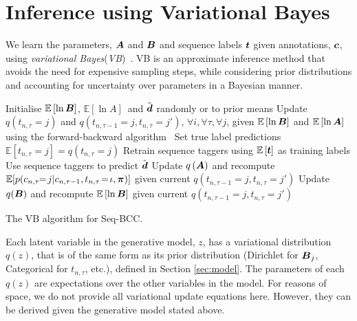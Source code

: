 
\section{Inference using Variational Bayes} \label{sec:vb}
 
We learn the parameters, $\boldsymbol A$ and $\boldsymbol B$ and sequence labels $\boldsymbol t$
given annotations, $\boldsymbol c$, using \emph{variational Bayes}(\emph{VB})~\cite{attias_advances_2000}.
VB is an approximate inference method that avoids the need for expensive sampling steps,
while considering prior distributions and accounting for uncertainty over parameters in a Bayesian manner.
\begin{algorithm}
 \nl Initialise $\mathbb{E}\left[\ln \boldsymbol B \right]$,
 $\mathbb{E}\left[\ln A \right]$\, and 
 $\hat{\boldsymbol d}$ randomly or to prior means\;
 {
 \nl Update $q(t_{n,\tau}=j)$ and $q(t_{n,\tau-1}=j, t_{n,\tau}=j')$, $\forall i,\forall \tau,\forall j$,
 given $\mathbb{E}\left[\ln \boldsymbol B \right]$ and 
 $\mathbb{E}\left[\ln\boldsymbol A \right]$
 using the forward-backward algorithm~\cite{ghahramani2001introduction}\;
 \nl Set true label predictions $\mathbb{E}\left[t_{n,\tau}=j\right] = q(t_{n,\tau}=j)$ \;
 \nl Retrain sequence taggers using $\mathbb{E}\left[\boldsymbol t\right]$ as training labels\;
 \nl Use sequence taggers to predict $\hat{\boldsymbol d}$\;
 \nl Update $q\left(\boldsymbol A\right)$ and recompute $\mathbb{E}[p( c_{n,\tau} \!\!=\! j | c_{n,\tau-1}, t_{n,\tau} \!=\! \iota, \boldsymbol\pi )]$ given current $q(t_{n,\tau-1}=j, t_{n,\tau}=j')$\;
 \nl Update $q(\boldsymbol B)$ and recompute $\mathbb{E}\left[\ln\boldsymbol B \right]$ given current $q(t_{n,\tau-1}=j, t_{n,\tau}=j')$\;
 }
\caption{The VB algorithm for Seq-BCC.}
\label{al:vb_bac}
\end{algorithm}
Each latent variable in the generative model, $z$, has a variational distribution $q(z)$,
that is of the same form as its prior distribution (Dirichlet for $\boldsymbol B_j$, Categorical for $t_{n,\tau}$, etc.),
defined in Section \ref{sec:model}.
The parameters of each $q(z)$ are expectations over the other variables in the model.
For reasons of space, we do not provide all variational update equations here.
However, they can be derived given the generative model stated above.

